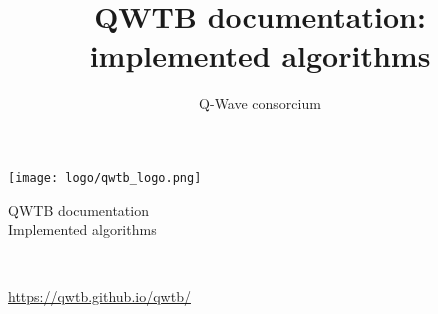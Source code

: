 \documentclass[12pt,a4paper,oneside]{report} %
\begin{document}
\renewcommand\floatpagefraction{.9} \renewcommand\topfraction{.9} \renewcommand\bottomfraction{.9} \renewcommand\textfraction{.1} \setcounter{totalnumber}{50} \setcounter{topnumber}{50} \setcounter{bottomnumber}{50} %
\renewcommand{\labelitemi}{--}          %
\setlength{\unitlength}{1mm}            %

\newenvironment{tightdesc}{\begin{description}[itemsep=0pt]} 
                              {\end{description}}

\def\infosection{Description}
\def\examplesection{Example}
\renewcommand{\chaptername}{}

\title{QWTB documentation: implemented algorithms}
\author{Q-Wave consorcium}

\thispagestyle{empty}
\begin{center}
        \vspace*{10em}
        {\huge
        \texttt{[image: logo/qwtb\_logo.png]}

        \vspace{2.0em}
        QWTB documentation\\

        \vspace{1.5em}
        Implemented algorithms}\\

        \vfill
        {\Large \color{red}{\today}}

        \vspace{1em}
        {\Large \url{https://qwtb.github.io/qwtb/}}
\end{center}
\newpage

\startcontents[maintoc]
\end{document}
